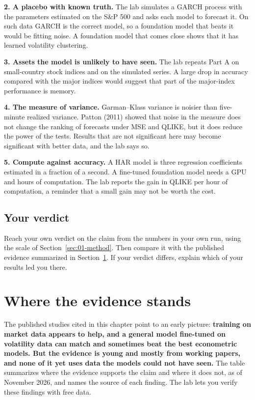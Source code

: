 \textbf{2. A placebo with known truth.} The lab simulates a GARCH process with the parameters estimated on the S\&P 500 and asks each model to forecast it. On such data GARCH is the correct model, so a foundation model that beats it would be fitting noise. A foundation model that comes close shows that it has learned volatility clustering.

\textbf{3. Assets the model is unlikely to have seen.} The lab repeats Part A on small-country stock indices and on the simulated series. A large drop in accuracy compared with the major indices would suggest that part of the major-index performance is memory.

\textbf{4. The measure of variance.} Garman--Klass variance is noisier than five-minute realized variance. Patton (2011) showed that noise in the measure does not change the ranking of forecasts under MSE and QLIKE, but it does reduce the power of the tests. Results that are not significant here may become significant with better data, and the lab says so.

\textbf{5. Compute against accuracy.} A HAR model is three regression coefficients estimated in a fraction of a second. A fine-tuned foundation model needs a GPU and hours of computation. The lab reports the gain in QLIKE per hour of computation, a reminder that a small gain may not be worth the cost.

\subsection*{Your verdict}

Reach your own verdict on the claim from the numbers in your own run, using the scale of Section~\ref{sec:01-method}. Then compare it with the published evidence summarized in Section~\ref{sec:23-verdict}. If your verdict differs, explain which of your results led you there.

\section{Where the evidence stands}
\label{sec:23-verdict}

The published studies cited in this chapter point to an early picture: \textbf{training on market data appears to help, and a general model fine-tuned on volatility data can match and sometimes beat the best econometric models. But the evidence is young and mostly from working papers, and none of it yet uses data the models could not have seen.} The table summarizes where the evidence supports the claim and where it does not, as of November 2026, and names the source of each finding. The lab lets you verify these findings with free data.

